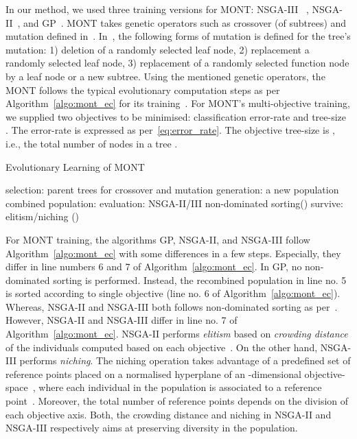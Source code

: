 \documentclass[conference]{IEEEtran}
\begin{document}
In our method, we used three training versions for MONT: NSGA-III~
\cite{deb2013evolutionary}, NSGA-II~\cite{deb2000fast}, and GP~\cite{schmidt2009solving}. MONT takes genetic operators such as crossover (of subtrees)  and mutation defined in~\cite{ojha2017ensemble}. In~\cite{ojha2017ensemble}, the following forms of mutation is defined for the tree's mutation: 1) deletion of a randomly selected leaf node, 2) replacement a randomly selected leaf node, 3) replacement of a randomly selected function node by a leaf node or a new subtree. Using the mentioned genetic operators, the MONT follows the typical evolutionary computation steps as per Algorithm~\ref{algo:mont_ec} for its training~\cite{goldberg1989genetic}. For MONT's multi-objective training, we supplied two objectives to be minimised: classification  error-rate  and tree-size . The error-rate  is expressed as per~\eqref{eq:error_rate}. The objective tree-size  is , i.e.,  the total number of nodes in a tree .
\begin{algorithm}
    \caption{Evolutionary Learning of MONT}
    \label{algo:mont_ec}
    \begin{algorithmic}[1]
        \Statex
        \State selection: parent trees for crossover and mutation
        \State generation: a new population 
        \State combined population: 
        \State evaluation: NSGA-II/III non-dominated sorting()
        \State survive: elitism/niching ()
        \EndWhile
        \State \Return { }
        \EndFunction
    \end{algorithmic}
\end{algorithm}

For MONT training, the algorithms GP, NSGA-II, and NSGA-III follow Algorithm~\ref{algo:mont_ec} with some differences in a few steps. Especially, they differ in line numbers 6 and 7 of Algorithm~\ref{algo:mont_ec}. In GP, no non-dominated sorting is performed. Instead, the recombined population  in line no. 5 is sorted according to single objective  (line no. 6 of Algorithm~\ref{algo:mont_ec}). Whereas, NSGA-II and NSGA-III both follows {non-dominated sorting} as per~\cite{deb2000fast}. However, NSGA-II and NSGA-III differ in line no. 7 of Algorithm~\ref{algo:mont_ec}.  NSGA-II performs \textit{elitism} based on \textit{crowding distance} of the individuals computed based on each objective~\cite{deb2000fast}. On the other hand, NSGA-III performs \textit{niching}. The niching operation takes advantage of a predefined set of reference points placed on a normalised hyperplane of an -dimensional objective-space~\cite{das1998normal}, where each individual in the population is associated to a reference point~\cite{deb2013evolutionary}. Moreover, the total number of reference points depends on the division of each objective axis. Both, the crowding distance and niching in NSGA-II and NSGA-III respectively aims at preserving diversity in the population.
\end{document}
